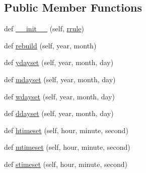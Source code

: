\subsection*{Public Member Functions}
\begin{DoxyCompactItemize}
\item 
def \hyperlink{classdateutil_1_1rrule_1_1__iterinfo_a4569daf80ca6fa655b9b69bcdc025122}{\+\_\+\+\_\+init\+\_\+\+\_\+} (self, \hyperlink{classdateutil_1_1rrule_1_1rrule}{rrule})
\item 
def \hyperlink{classdateutil_1_1rrule_1_1__iterinfo_ae1ffc2c13d1d7c8c9ee79fbdb4a26e68}{rebuild} (self, year, month)
\item 
def \hyperlink{classdateutil_1_1rrule_1_1__iterinfo_ab13cf2eaef7f3891bae1e9163dc3859a}{ydayset} (self, year, month, day)
\item 
def \hyperlink{classdateutil_1_1rrule_1_1__iterinfo_a2a88629be6e4a7d8f9ef180170319211}{mdayset} (self, year, month, day)
\item 
def \hyperlink{classdateutil_1_1rrule_1_1__iterinfo_a4d7f3a1f20f8cc14d11d05eb8acc7a8c}{wdayset} (self, year, month, day)
\item 
def \hyperlink{classdateutil_1_1rrule_1_1__iterinfo_a6de895d7c2b7f21baa41146533b13763}{ddayset} (self, year, month, day)
\item 
def \hyperlink{classdateutil_1_1rrule_1_1__iterinfo_ab67ea968b699a07fdadbb1faf7bfe675}{htimeset} (self, hour, minute, second)
\item 
def \hyperlink{classdateutil_1_1rrule_1_1__iterinfo_a0321401495a83d6421733d01dac2dfac}{mtimeset} (self, hour, minute, second)
\item 
def \hyperlink{classdateutil_1_1rrule_1_1__iterinfo_a540a3280f4867c1f3c5a7aded9a8243c}{stimeset} (self, hour, minute, second)
\end{DoxyCompactItemize}
